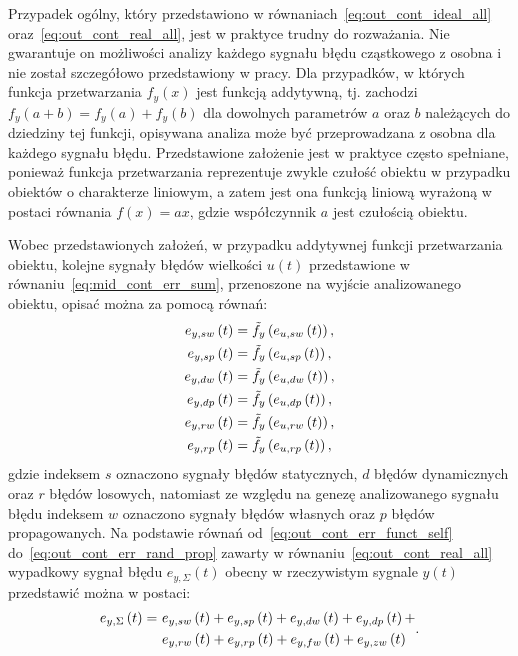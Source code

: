 Przypadek ogólny, który przedstawiono w równaniach~\eqref{eq:out_cont_ideal_all} oraz~\eqref{eq:out_cont_real_all}, jest w praktyce trudny do rozważania. Nie gwarantuje on możliwości analizy każdego sygnału błędu cząstkowego z osobna i nie został szczegółowo przedstawiony w pracy. Dla przypadków, w których funkcja przetwarzania $f_{y}(x)$ jest funkcją addytywną, tj. zachodzi $f_{y}(a + b) = f_{y}(a) + f_{y}(b)$ dla dowolnych parametrów $a$ oraz $b$ należących do dziedziny tej funkcji, opisywana analiza może być przeprowadzana z osobna dla każdego sygnału błędu. Przedstawione założenie jest w praktyce często spełniane, ponieważ funkcja przetwarzania reprezentuje zwykle czułość obiektu w przypadku obiektów o charakterze liniowym, a zatem jest ona funkcją liniową wyrażoną w postaci równania $f(x) = ax$, gdzie współczynnik $a$ jest czułością obiektu.

Wobec przedstawionych założeń, w przypadku addytywnej funkcji przetwarzania obiektu, kolejne sygnały błędów wielkości $u(t)$ przedstawione w równaniu~\eqref{eq:mid_cont_err_sum}, przenoszone na wyjście analizowanego obiektu, opisać można za pomocą równań:
\begin{gather}
e_{y,sw} \left(t\right) = \tilde{f}_{y} \left( e_{u,sw} \left(t\right) \right) \label{eq:out_cont_err_stat_self}, \\
e_{y,sp} \left(t\right) = \tilde{f}_{y} \left( e_{u,sp} \left(t\right) \right) \label{eq:out_cont_err_stat_prop}, \\
e_{y,dw} \left(t\right) = \tilde{f}_{y} \left( e_{u,dw} \left(t\right) \right) \label{eq:out_cont_err_dyn_self}, \\
e_{y,dp} \left(t\right) = \tilde{f}_{y} \left( e_{u,dp} \left(t\right) \right) \label{eq:out_cont_err_dyn_prop}, \\
e_{y,rw} \left(t\right) = \tilde{f}_{y} \left( e_{u,rw} \left(t\right) \right) \label{eq:out_cont_err_rand_self}, \\
e_{y,rp} \left(t\right) = \tilde{f}_{y} \left( e_{u,rp} \left(t\right) \right) \label{eq:out_cont_err_rand_prop},
\end{gather}
gdzie indeksem $s$ oznaczono sygnały błędów statycznych, $d$ błędów dynamicznych oraz $r$ błędów losowych, natomiast ze względu na genezę analizowanego sygnału błędu indeksem $w$ oznaczono sygnały błędów własnych oraz $p$ błędów propagowanych. Na podstawie równań od~\eqref{eq:out_cont_err_funct_self} do~\eqref{eq:out_cont_err_rand_prop} zawarty w równaniu~\eqref{eq:out_cont_real_all} wypadkowy sygnał błędu $e_{y,\Sigma}(t)$ obecny w rzeczywistym sygnale $y(t)$ przedstawić można w postaci:
\begin{equation}
\begin{split}
e_{y,\Sigma} \left(t\right) = ~
& e_{y,sw} \left(t\right) + e_{y,sp} \left(t\right) + e_{y,dw} \left(t\right) + e_{y,dp} \left(t\right) + \\
& e_{y,rw} \left(t\right) + e_{y,rp} \left(t\right) + e_{y,fw} \left(t\right) + e_{y,zw} \left(t\right)
\end{split}
\label{eq:out_cont_err_sum_all}.
\end{equation}

